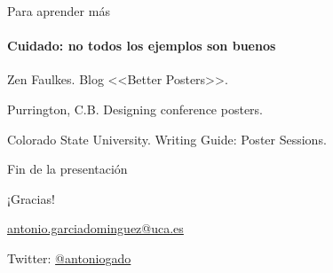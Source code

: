 \documentclass[xcolor=svgnames,compress]{beamer}
\begin{document}
\appendix

\begin{frame}{Para aprender más}
  \framesubtitle{Cuidado: no todos los ejemplos son buenos}

  \begin{thebibliography}{10}
    \beamertemplatearticlebibitems
     Zen Faulkes.
      \newblock Blog <<Better Posters>>.

     Purrington, C.B.
      \newblock Designing conference posters.

     Colorado State University.
      \newblock Writing Guide: Poster Sessions.
  \end{thebibliography}
\end{frame}

\begin{frame}{Fin de la presentación}
  \begin{center}


    {\Huge ¡Gracias!}


    {\Large
      \href{mailto:antonio.garciadominguez@uca.es}{antonio.garciadominguez@uca.es}


      Twitter: \href{http://twitter.com/antoniogado}{@antoniogado}}
  \end{center}
\end{frame}
\end{document}
